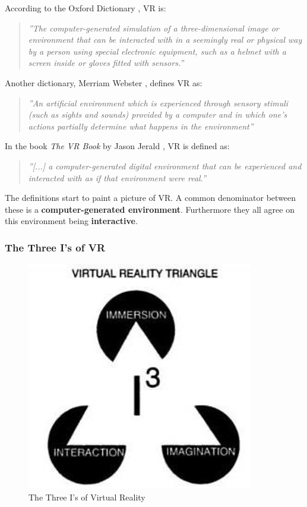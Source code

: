         According to the Oxford Dictionary \cite{oxford}, VR is:
        
        \begin{quote}
            \textit{''The computer-generated simulation of a three-dimensional image or environment that can be interacted with in a seemingly real or physical way by a person using special electronic equipment, such as a helmet with a screen inside or gloves fitted with sensors.''}
        \end{quote}
        
        Another dictionary, Merriam Webster \cite{merrian_webster}, defines VR as:
        
        \begin{quote}
            \textit{''An artificial environment which is experienced through sensory stimuli (such as sights and sounds) provided by a computer and in which one's actions partially determine what happens in the environment''}
        \end{quote}
        
        In the book \emph{The VR Book} by Jason Jerald \cite{the_vr_book}, VR is defined as:
        
        \begin{quote}
            \textit{''[...] a computer-generated digital environment that can be experienced and interacted with as if that environment were real.''}
        \end{quote}
        
        The definitions start to paint a picture of VR. A common denominator between these is a \textbf{computer-generated environment}. Furthermore they all agree on this environment being \textbf{interactive}.
        
            \subsubsection{The Three I's of VR}
                \label{sec:threei}
            
                \FloatBarrier
                \begin{figure}[htbp]
                    \centering
                    \includegraphics[width=0.5\linewidth]{figures/three_i.png}
                    \caption{The Three I's of Virtual Reality}
                    \label{fig:three_i}
                \end{figure}
                \FloatBarrier
                
